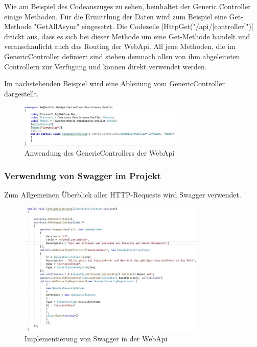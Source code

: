 Wie am Beispiel des Codeauszuges zu sehen, beinhaltet der Generic Controller einige Methoden.
Für die Ermittlung der Daten wird zum Beispiel eine Get-Methode "GetAllAsync" eingesetzt.
Die Codezeile [HttpGet("/api/[controller]")] drückt aus, dass es sich bei dieser Methode um eine Get-Methode handelt und veranschaulicht auch das Routing der WebApi.
All jene Methoden, die im GenericController definiert sind stehen demnach allen von ihm abgeleiteten Controllern zur Verfügung und können direkt verwendet werden.

Im nachstehenden Beispiel wird eine Ableitung vom GenericController dargestellt.

\begin{figure}[H]
    \centering
    \includegraphics[width=0.7\textwidth]{pics/VerwendungGenereicController.JPG}
    \caption{Anwendung des GenericControllers der WebApi}
\end{figure}


\subsubsection*{Verwendung von Swagger im Projekt}
Zum Allgemeinen Überblick aller HTTP-Requests wird Swagger verwendet.

\begin{figure}[H]
    \centering
    \includegraphics[width=0.8\textwidth]{pics/SwaggerImplementation.JPG}
    \caption{Implementierung von Swagger in der WebApi}
\end{figure}

